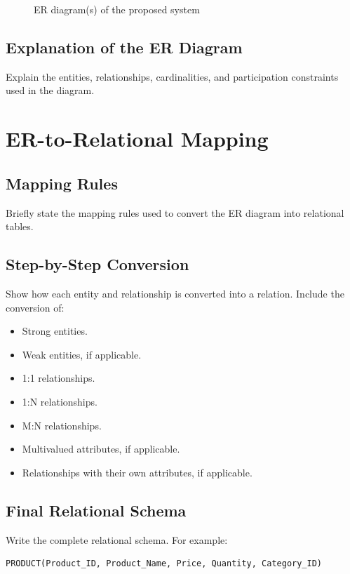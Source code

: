 \documentclass[12pt,a4paper]{report}
\begin{document}
\begin{figure}[h!]
    \centering
    \caption{ER diagram(s) of the proposed system}
\end{figure}

\section{Explanation of the ER Diagram}
Explain the entities, relationships, cardinalities, and participation constraints used in the diagram.

\chapter{ER-to-Relational Mapping}

\section{Mapping Rules}
Briefly state the mapping rules used to convert the ER diagram into relational tables.

\section{Step-by-Step Conversion}
Show how each entity and relationship is converted into a relation. Include the conversion of:
\begin{itemize}
    \item Strong entities.
    \item Weak entities, if applicable.
    \item 1:1 relationships.
    \item 1:N relationships.
    \item M:N relationships.
    \item Multivalued attributes, if applicable.
    \item Relationships with their own attributes, if applicable.
\end{itemize}

\section{Final Relational Schema}
Write the complete relational schema. For example:
\begin{verbatim}
PRODUCT(Product_ID, Product_Name, Price, Quantity, Category_ID)
\end{verbatim}
\end{document}
